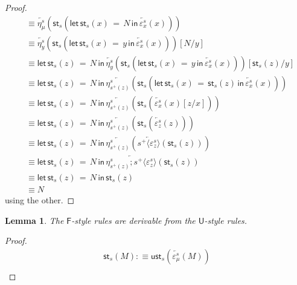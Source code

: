 \documentclass[10pt]{article}
\newtheorem{lemma}{Lemma}
\theoremstyle{definition}
\newcommand{\rewrite}[2]{\overleftarrow{#1}(#2)}
\newcommand\StI[2]{\ensuremath{\mathsf{st}_{#1}(#2)}}
\newcommand\UStI[2]{\ensuremath{\mathsf{ust}_{#1}(#2)}}
\newcommand\StE[4]{\ensuremath{\mathsf{let} \, \StI{#1}{#3} \, = \, {#2} \, \mathsf{in} \, #4}}
\newcommand\TrPlus[2]{\ensuremath{{#1}^+(#2)}}
\newcommand\ApPlus[2]{\ensuremath{{#1}^+ \langle #2 \rangle }}
\begin{document}
\begin{proof}
\begin{align*}
&\equiv \rewrite{\eta^s_\mu}{\StI{s}{\StE{s}{N}{x}{\rewrite{\varepsilon^s_x}{x}}}} \\ 
&\equiv \rewrite{\eta^s_y}{\StI{s}{\StE{s}{y}{x}{\rewrite{\varepsilon^s_x}{x}}}}[N/y] \\ 
&\equiv \StE{s}{N}{z}{\rewrite{\eta^s_y}{\StI{s}{\StE{s}{y}{x}{\rewrite{\varepsilon^s_x}{x}}}}[\StI{s}{z}/y]} \\ 
&\equiv \StE{s}{N}{z}{\rewrite{\eta^s_{\TrPlus{s}{z}}}{\StI{s}{\StE{s}{\StI{s}{z}}{x}{\rewrite{\varepsilon^s_x}{x}}}}} \\ 
&\equiv \StE{s}{N}{z}{\rewrite{\eta^s_{\TrPlus{s}{z}}}{\StI{s}{\rewrite{\varepsilon^s_x}{x}[z/x]}}} \\ 
&\equiv \StE{s}{N}{z}{\rewrite{\eta^s_{\TrPlus{s}{z}}}{\StI{s}{\rewrite{\varepsilon^s_z}{z}}}} \\ 
&\equiv \StE{s}{N}{z}{\rewrite{\eta^s_{\TrPlus{s}{z}}}{\rewrite{\ApPlus{s}{\varepsilon^s_z}}{\StI{s}{z}}}} \\ 
&\equiv \StE{s}{N}{z}{\rewrite{\eta^s_{\TrPlus{s}{z}};\ApPlus{s}{\varepsilon^s_z}}{\StI{s}{z}}} \\ 
&\equiv \StE{s}{N}{z}{\StI{s}{z}} \\ 
&\equiv N
\end{align*}
using the other.
\end{proof}

\begin{lemma}
The $\mathsf{F}$-style rules are derivable from the $\mathsf{U}$-style rules.
\end{lemma}
\begin{proof}
\begin{align*}
\StI{s}{M} :\equiv \UStI{s}{\rewrite{\varepsilon^s_\mu}{M}} \\
\end{align*}
\end{proof}
\end{document}
